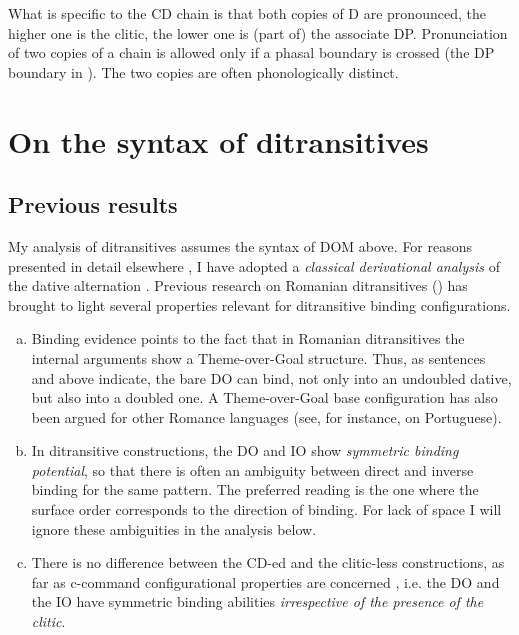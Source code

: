 \documentclass[output=paper,colorlinks,citecolor=brown,nonflat]{langsci/langscibook}
\begin{document}
What is specific to the CD chain is that both copies of D are pronounced, the higher one is the clitic, the lower one is (part of) the associate DP. Pronunciation of two copies of a chain is allowed only if a phasal boundary is crossed (the DP boundary in ). The two copies are often phonologically distinct.

\section{On the syntax of ditransitives} %

\subsection{{Previous} {results}}%

My analysis of ditransitives assumes the syntax of DOM above. For reasons presented in detail elsewhere \citep{CornilescuDinuTigău2017DOC}, I have adopted a \textit{classical derivational analysis} of the dative alternation \citep{HaradaLarson2009, OrmazabalRomero2017}. Previous research on Romanian ditransitives (\citealt{DiaconescuRivero2007, CornilescuDinuTigău2017DOC}) has brought to light several properties relevant for ditransitive binding configurations.

\begin{enumerate}[a.]
	\item Binding evidence points to the fact that in Romanian ditransitives the internal arguments show a Theme-over-Goal structure. Thus, as sentences  and  above indicate, the bare DO can bind, not only into an undoubled dative, but also into a doubled one. A Theme-over-Goal base configuration has also been argued for other Romance languages (see, for instance,  on Portuguese).

	\item In ditransitive constructions, the DO and IO show \textit{symmetric binding potential}, so that there is often an ambiguity between direct and inverse binding for the same pattern. The preferred reading is the one where the surface order corresponds to the direction of binding. For lack of space I will ignore these ambiguities in the analysis below.

	\item There is no difference between the CD-ed and the clitic-less constructions, as far as c-command configurational properties are concerned \citep{CornilescuDinuTigău2017DOC}, i.e. the DO and the IO have symmetric binding abilities \textit{irrespective of the presence of the clitic}.
\end{enumerate}
\end{document}
